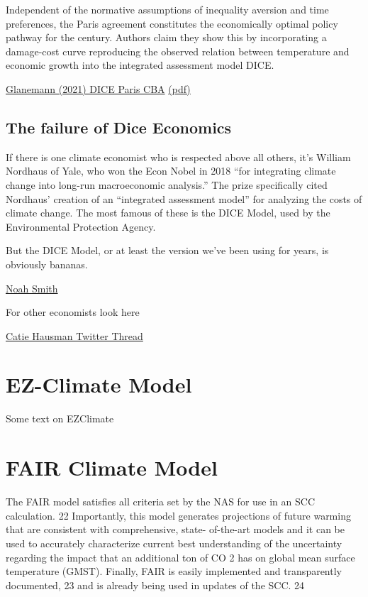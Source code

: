 \documentclass[
]{book}
\begin{document}
Independent of the
normative assumptions of inequality aversion and time preferences,
the Paris agreement constitutes the economically optimal policy pathway
for the century.
Authors claim they show this by incorporating a
damage-cost curve reproducing
the observed relation between temperature
and economic growth into the integrated assessment model DICE.

\href{https://www.nature.com/articles/s41467-019-13961-1}{Glanemann (2021) DICE Paris CBA}
\href{pdf/Glanemann_2021_DICE_Paris_CBA.pdf}{(pdf)}

\hypertarget{the-failure-of-dice-economics}{%
\subsection{The failure of Dice Economics}\label{the-failure-of-dice-economics}}

If there is one climate economist who is respected above all others, it's William Nordhaus of Yale, who won the Econ Nobel in 2018 ``for integrating climate change into long-run macroeconomic analysis.'' The prize specifically cited Nordhaus' creation of an ``integrated assessment model'' for analyzing the costs of climate change. The most famous of these is the DICE Model, used by the Environmental Protection Agency.

But the DICE Model, or at least the version we've been using for years, is obviously bananas.

\href{https://noahpinion.substack.com/p/why-has-climate-economics-failed}{Noah Smith}

For other economists look here

\href{https://twitter.com/CatieHausman/status/1381999336423362568}{Catie Hausman Twitter Thread}

\hypertarget{ez-climate-model}{%
\section{EZ-Climate Model}\label{ez-climate-model}}

Some text on EZClimate

\hypertarget{fair-climate-model}{%
\section{FAIR Climate Model}\label{fair-climate-model}}

The FAIR model satisfies all
criteria set by the NAS for use in an SCC calculation. 22 Importantly, this model
generates projections of future warming that are consistent with comprehensive, state-
of-the-art models and it can be used to accurately characterize current best
understanding of the uncertainty regarding the impact that an additional ton of CO 2
has on global mean surface temperature (GMST). Finally, FAIR is easily implemented
and transparently documented, 23 and is already being used in updates of the SCC. 24
\end{document}
